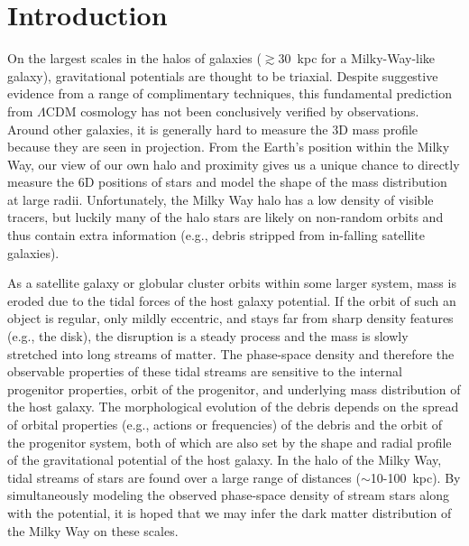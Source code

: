 \documentclass[letterpaper,12pt,preprint]{aastex}
\begin{document}
\keywords{
}


\section{Introduction}\label{sec:introduction}

On the largest scales in the halos of galaxies ($\gtrsim$30~kpc for a Milky-Way-like galaxy), gravitational potentials are thought to be triaxial. Despite suggestive evidence from a range of complimentary techniques, this fundamental prediction from $\Lambda$CDM cosmology has not been conclusively verified by observations. Around other galaxies, it is generally hard to measure the 3D mass profile because they are seen in projection. From the Earth's position within the Milky Way, our view of our own halo and proximity gives us a unique chance to directly measure the 6D positions of stars and model the shape of the mass distribution at large radii. Unfortunately, the Milky Way halo has a low density of visible tracers, but luckily many of the halo stars are likely on non-random orbits and thus contain extra information (e.g., debris stripped from in-falling satellite galaxies).

As a satellite galaxy or globular cluster orbits within some larger system, mass is eroded due to the tidal forces of the host galaxy potential. If the orbit of such an object is regular, only mildly eccentric, and stays far from sharp density features (e.g., the disk), the disruption is a steady process and the mass is slowly stretched into long streams of matter. The phase-space density and therefore the observable properties of these tidal streams are sensitive to the internal progenitor properties, orbit of the progenitor, and underlying mass distribution of the host galaxy. The morphological evolution of the debris depends on the spread of orbital properties (e.g., actions or frequencies) of the debris and the orbit of the progenitor system, both of which are also set by the shape and radial profile of the gravitational potential of the host galaxy. In the halo of the Milky Way, tidal streams of stars are found over a large range of distances ($\sim$10-100~kpc). By simultaneously modeling the observed phase-space density of stream stars along with the potential, it is hoped that we may infer the dark matter distribution of the Milky Way on these scales.
\end{document}

